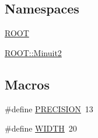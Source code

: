 \subsection*{Namespaces}
\begin{DoxyCompactItemize}
\item 
 \mbox{\hyperlink{namespaceROOT}{R\+O\+OT}}
\item 
 \mbox{\hyperlink{namespaceROOT_1_1Minuit2}{R\+O\+O\+T\+::\+Minuit2}}
\end{DoxyCompactItemize}
\subsection*{Macros}
\begin{DoxyCompactItemize}
\item 
\#define \mbox{\hyperlink{adat-devel_2other__libs_2minuit_2src_2MnPrint_8cxx_a9c7b069fee3c8184e14a7de8e5da2dc6}{P\+R\+E\+C\+I\+S\+I\+ON}}~13
\item 
\#define \mbox{\hyperlink{adat-devel_2other__libs_2minuit_2src_2MnPrint_8cxx_a241aeeb764887ae5e3de58b98f04b16d}{W\+I\+D\+TH}}~20
\end{DoxyCompactItemize}
